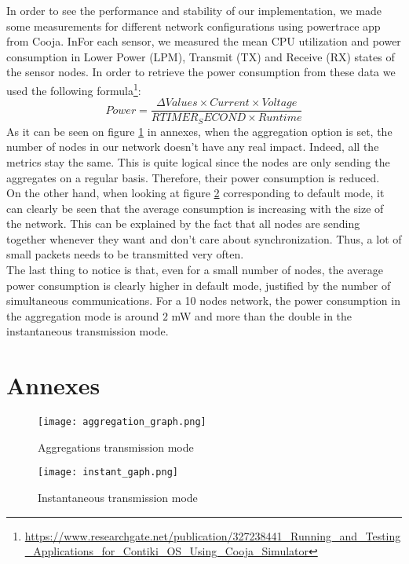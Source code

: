 \documentclass{article}
\begin{document}
In order to see the performance and stability of our implementation, we made some measurements for different network configurations using powertrace app from Cooja. InFor each sensor, we measured the mean CPU utilization and power consumption in Lower Power (LPM), Transmit (TX) and Receive (RX) states of the sensor nodes. In order to retrieve the power consumption from these data we used the following formula\footnote{\url{https://www.researchgate.net/publication/327238441_Running_and_Testing_Applications_for_Contiki_OS_Using_Cooja_Simulator}}:\\
$$ Power = \frac{\Delta Values\times Current \times Voltage}{RTIMER_SECOND\times Runtime} $$
As it can be seen on figure \ref{g1} in annexes, when the aggregation option is set, the number of nodes in our network doesn't have any real impact. Indeed, all the metrics stay the same. This is quite logical since the nodes are only sending the aggregates on a regular basis. Therefore, their power consumption is reduced.\\
On the other hand, when looking at figure \ref{g2} corresponding to default mode, it can clearly be seen that the average consumption is increasing with the size of the network. This can be explained by the fact that all nodes are sending together whenever they want and don't care about synchronization. Thus, a lot of small packets needs to be transmitted very often.\\
The last thing to notice is that, even for a small number of nodes, the average power consumption is clearly higher in default mode, justified by the number of simultaneous communications. For a 10 nodes network, the power consumption in the aggregation mode is around $2$ mW and more than the double in the instantaneous transmission mode.

\newpage
\section{Annexes}

\begin{center}
    \begin{figure}[!h]
       \texttt{[image: aggregation\_graph.png]}
       \caption{\label{g1} Aggregations transmission mode}
    \end{figure}
\end{center}

\begin{center}
    \begin{figure}[!h]
       \texttt{[image: instant\_gaph.png]}
       \caption{\label{g2} Instantaneous transmission mode}
    \end{figure}
\end{center}
\end{document}
